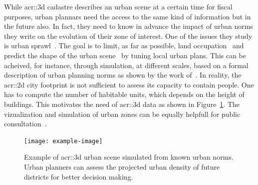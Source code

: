             While \gls{acr::3d} cadastre describes an urban scene at a certain time for fiscal purposes, urban plannars need the access to the same kind of information but in the future also.
            In fact, they need to know in advance the impact of urban norms they write on the evolution of their zone of interest. 
            One of the issues they study is urban sprawl~\parencite{ludlow2006urban}.
            The goal is to limit, as far as possible, land occupation~\parencite{TANNIER2012128} and predict the shape of the urban scene~\parencite{brasebin20183d} by tuning local urban plans.
            This can be acheived, for instance, through simulation, at different scales, based on a formal description of urban planning norms as shown by the work of~\textcite{Colomb17a}.
            In reality, the \gls{acr::2d} city footprint is not sufficient to assess its capacity to contain people.
            One has to compute the number of habitable units, which depends on the height of buildings.
            This motivates the need of \gls{acr::3d} data as shown in Figure~\ref{fig::3d_simulation}.
            The  vizualization and simulation of urban zones can be equally helpfull for public consultation~\parencite{WU2010291}.\\
            \begin{figure}[htpb]
                \centering
                \texttt{[image: example-image]}            
                \caption{
                    \label{fig::3d_simulation} Example of \gls{acr::3d} urban scene simulated from known urban norms.
                    Urban planners can assess the projected urban density of future districts for better decision making.
                }
            \end{figure}
